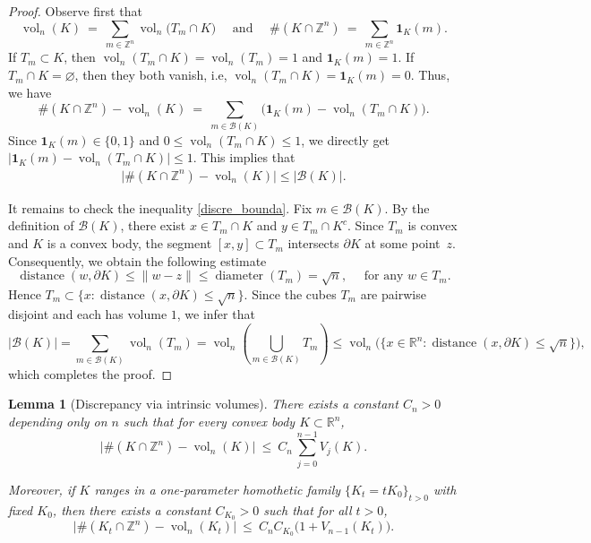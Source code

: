 \documentclass[11pt]{article}
\newtheorem{lemma}[theorem]{Lemma}
\theoremstyle{definition}
\numberwithin{equation}{section}
\newcommand{\R}{\mathbb{R}}
\newcommand{\Z}{\mathbb{Z}}
\DeclareMathOperator{\vol}{vol}
\begin{document}
\begin{proof}
Observe first that
\[
  \vol_n(K)\ =\ \sum_{m\in\Z^n} \vol_n\big(T_m\cap K\big) \quad \text{ and } \quad
  \#(K\cap\Z^n)\ =\ \sum_{m\in\Z^n} \pmb 1_K(m).
\]
If $T_m\subset K$, then $\vol_n(T_m \cap K) = \vol_n(T_m) = 1$ and $\pmb 1_K(m) = 1$.
If $T_m\cap K=\varnothing$, then they both vanish, i.e, $\vol_n(T_m \cap K) = \pmb 1_K(m) = 0$.
Thus, we have
\[
  \#(K\cap\Z^n)-\vol_n(K)\ =\ \sum_{m\in\mathcal B(K)}
  \big( \pmb 1_K(m)-\vol_n(T_m\cap K) \big).
\]
Since $\pmb 1_K(m) \in \{ 0, 1 \}$ and $0 \leq \vol_n(T_m \cap K) \leq 1$, we directly get $|\pmb 1_K(m) - \vol_n(T_m \cap K) | \leq 1$. 
This implies that
\begin{align*}
    \big\vert \#(K \cap \Z^n) - \vol_n(K)  \big\vert \leq \big\vert \mathcal B(K) \big\vert.
\end{align*}

\medskip

It remains to check the inequality \eqref{discre_bounda}.
Fix $m\in\mathcal B(K)$.
By the definition of $\mathcal B(K)$, there exist $x\in T_m\cap K$
and $y\in T_m\cap K^c$. 
Since $T_m$ is convex and $K$ is a convex body, the segment $[x,y]\subset T_m$ intersects $\partial K$ at some point~$z$.
Consequently, we obtain the following estimate
\[
  \operatorname{distance}(w,\partial K)  \leq \|w-z\| \leq \operatorname{diameter}(T_m) = \sqrt n, \quad \text{ for any $w\in T_m$}.
\]
Hence $T_m\subset \{x:\operatorname{distance}(x,\partial K)\le\sqrt n\}$. 
Since the cubes $T_m$ are pairwise disjoint and each has volume $1$, we infer that
\[
  |\mathcal B(K)| = \sum_{m\in\mathcal B(K)}\vol_n(T_m)
  = \vol_n \left(\bigcup_{m\in\mathcal B(K)}T_m\right)
  \leq \vol_n\big(\{x \in \R^n :\operatorname{distance}(x,\partial K)\le\sqrt n\}\big),
\]
which completes the proof.
\end{proof}

\begin{lemma}[Discrepancy via intrinsic volumes]\label{prop:disc-V}
There exists a constant $C_n>0$ depending only on $n$ such that for every convex body $K\subset\R^n$,
\begin{equation}\label{eq:disc-intrinsic}
  \big|\#(K\cap\Z^n)-\vol_n(K)\big|\ \le\
  C_n\,\sum_{j=0}^{n-1} V_j(K).
\end{equation}

Moreover, if $K$ ranges in a one-parameter homothetic family $\{ K_t = tK_0 \}_{t > 0}$ with fixed $K_0$, then there exists a constant $C_{K_0}>0$ such that for all $t>0$,
\begin{equation}\label{eq:disc-intrinsic-(n-1)}
  \big|\#(K_t\cap\Z^n)-\vol_n(K_t)\big|\ \le\ C_nC_{K_0} \big(1+V_{n-1}(K_t)\big).
\end{equation}
\end{lemma}
\end{document}
